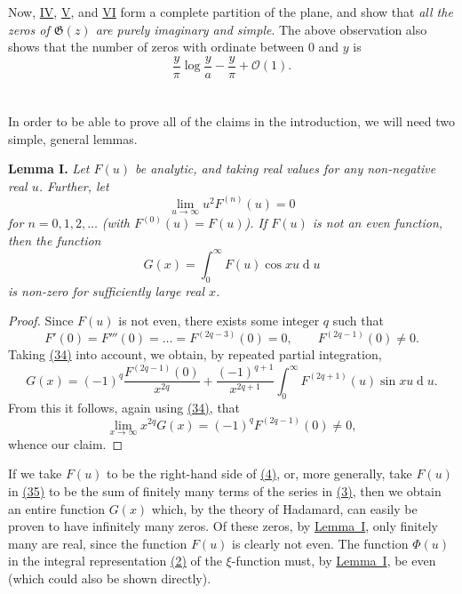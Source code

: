 \documentclass{article}
\theoremstyle{plain}
\newenvironment{itenv}[1]
  {\phantomsection\par\medskip\noindent\textbf{#1.}\itshape}
  {\medskip}
\newcommand{\dd}{\operatorname{d}\!}
\newcommand{\GG}{\mathfrak{G}}
\newcommand{\error}{\mathcal{O}}
\newcommand{\oldpage}[1]{\marginpar{\footnotesize$\Big\vert$ \textit{p.~#1}}}
\begin{document}
Now, \hyperref[IV]{IV}, \hyperref[V]{V}, and \hyperref[VI]{VI} form a complete partition of the plane, and show that \emph{all the zeros of $\GG(z)$ are purely imaginary and simple}.
The above observation also shows that the number of zeros with ordinate between $0$ and $y$ is
\[
  \frac{y}{\pi}\log\frac{y}{a} - \frac{y}{\pi} + \error(1).
\]


\section{}
\label{section4}

In order to be able to prove all of the claims in the introduction, we will need two simple, general lemmas.

\begin{itenv}{Lemma I}
\label{lemma1}
  Let $F(u)$ be analytic, and taking real values for any non-negative real $u$.
  Further, let
  \[
  \label{34}
    \lim_{u\to\infty} u^2 F^{(n)}(u) = 0
  \tag{34}
  \]
  for $n=0,1,2,\ldots$ (with $F^{(0)}(u)=F(u)$).
  If $F(u)$ is not an even function, then the function
  \[
  \label{35}
    G(x) = \int_0^\infty F(u)\cos xu \dd u
  \tag{35}
  \]
  is non-zero for sufficiently large real $x$.
\end{itenv}
\begin{proof}
  Since $F(u)$ is not even, there exists some integer $q$ such that
  \[
    F'(0) = F'''(0) = \ldots = F^{(2q-3)}(0) = 0,
    \qquad F^{(2q-1)}(0) \neq 0.
  \]
\oldpage{316}
  Taking \hyperref[34]{(34)} into account, we obtain, by repeated partial integration,
  \[
    G(x) = (-1)^q \frac{F^{(2q-1)}(0)}{x^{2q}} + \frac{{(-1)^{q+1}}}{x^{2q+1}} \int_0^\infty F^{(2q+1)}(u)\sin xu \dd u.
  \]
  From this it follows, again using \hyperref[34]{(34)}, that
  \[
    \lim_{x\to\infty} x^{2q}G(x) = (-1)^q F^{(2q-1)}(0) \neq 0,
  \]
  whence our claim.
\end{proof}

If we take $F(u)$ to be the right-hand side of \hyperref[4]{(4)}, or, more generally, take $F(u)$ in \hyperref[35]{(35)} to be the sum of finitely many terms of the series in \hyperref[3]{(3)}, then we obtain an entire function $G(x)$ which, by the theory of Hadamard, can easily be proven to have infinitely many zeros.
Of these zeros, by \hyperref[lemma1]{Lemma~I}, only finitely many are real, since the function $F(u)$ is clearly not even.
The function $\Phi(u)$ in the integral representation \hyperref[2]{(2)} of the $\xi$-function must, by \hyperref[lemma1]{Lemma~I}, be even (which could also be shown directly).
\end{document}
